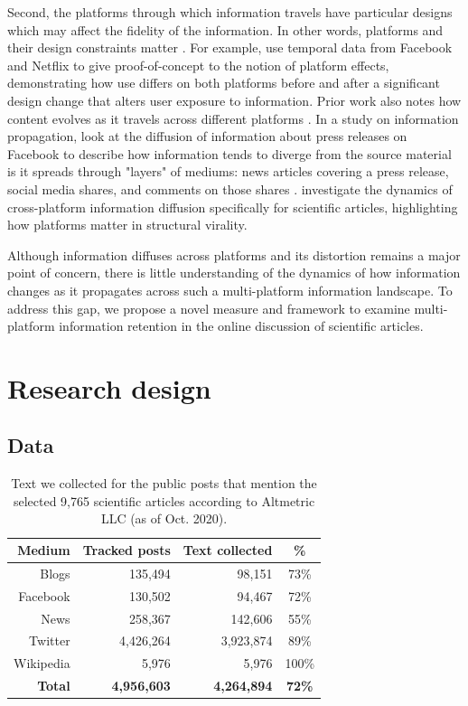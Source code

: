 \documentclass[letterpaper]{article} %
\begin{document}
Second, the platforms through which information travels have particular designs which may affect the fidelity of the information. In other words, platforms and their design constraints matter \citep{malikIdentifyingPlatformEffects2016,gligoricHowConstraintsAffect2018}. For example, \citet{malikIdentifyingPlatformEffects2016} use temporal data from Facebook and Netflix to give proof-of-concept to the notion of platform effects, demonstrating how use differs on both platforms before and after a significant design change that alters user exposure to information. Prior work also notes how content evolves as it travels across different platforms \citep{leskovecMemetrackingDynamicsNews2009,tanLostPropagationUnfolding2016,phadkeManyFacedHate2020}. In a study on information propagation, \citet{tanLostPropagationUnfolding2016} look at the diffusion of information about press releases on Facebook to describe how information tends to diverge from the source material is it spreads through "layers" of mediums: news articles covering a press release, social media shares, and comments on those shares \citep{tanLostPropagationUnfolding2016}.
\citet{zakhlebinDiffusionScientificArticles2020} investigate the dynamics of cross-platform information diffusion specifically for scientific articles, highlighting how platforms matter in structural virality.


Although information diffuses across platforms and its distortion remains a major point of concern, there is little understanding of the dynamics of how information changes as it propagates across such a multi-platform information landscape. To address this gap, we propose a novel measure and framework to examine multi-platform information retention in the online discussion of scientific articles.


\section{Research design}
\subsection{Data}
\begin{table}[t]
\centering
\begin{tabular}{r|r|r|c}
\textbf{Medium} & \textbf{Tracked posts} & \textbf{Text collected} & \textbf{\%} \\
\hline
Blogs & 135,494 & 98,151 & 73\% \\
Facebook & 130,502 & 94,467 & 72\% \\
News & 258,367 & 142,606 &  55\% \\
Twitter & 4,426,264 & 3,923,874 & 89\% \\
Wikipedia & 5,976 & 5,976 & 100\% \\
\hline
\textbf{Total} & \textbf{4,956,603} & \textbf{4,264,894} & \textbf{72\%}\\
\end{tabular}
\caption{Text we collected for the public posts that mention the selected 9,765 scientific articles according to Altmetric LLC (as of Oct. 2020).}
\label{tab:collected_data_nums}
\end{table}
\end{document}
